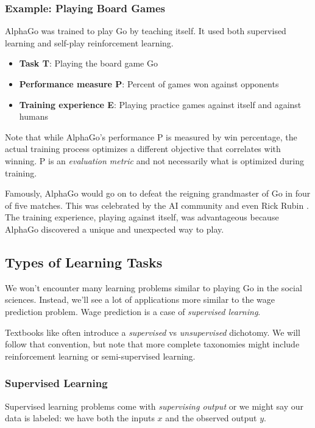 \subsubsection{Example: Playing Board Games}

AlphaGo was trained to play Go by teaching itself. It used both supervised learning and self-play reinforcement learning.

\begin{itemize}
\item \textbf{Task T}: Playing the board game Go
\item \textbf{Performance measure P}: Percent of games won against opponents
\item \textbf{Training experience E}: Playing practice games against itself and against humans
\end{itemize}

Note that while AlphaGo's performance P is measured by win percentage, the actual training process optimizes a different objective that correlates with winning. P is an \textit{evaluation metric} and not necessarily what is optimized during training.

Famously, AlphaGo would go on to defeat the reigning grandmaster of Go in four of five matches. This was celebrated by the AI community and even Rick Rubin \cite{rubin2023creative}. The training experience, playing against itself, was advantageous because AlphaGo discovered a unique and unexpected way to play.

\subsection{Types of Learning Tasks}

We won't encounter many learning problems similar to playing Go in the social sciences. Instead, we'll see a lot of applications more similar to the wage prediction problem. Wage prediction is a case of \textit{supervised learning}.

Textbooks like \cite{james2023introduction} often introduce a \textit{supervised} vs \textit{unsupervised} dichotomy. We will follow that convention, but note that more complete taxonomies might include reinforcement learning or semi-supervised learning.

\subsubsection{Supervised Learning}

Supervised learning problems come with \textit{supervising output} or we might say our data is labeled: we have both the inputs $x$ and the observed output $y$.


